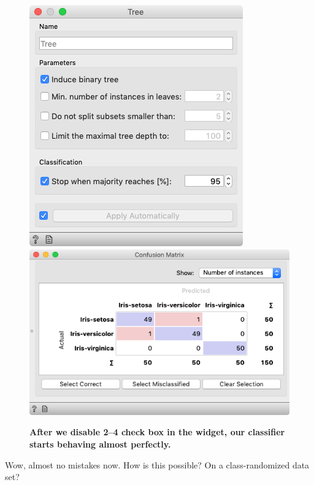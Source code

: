 \begin{figure}[h]
    \includegraphics[scale=0.35]{better_tree.png}
    \includegraphics[scale=0.35]{confusion_randomized_better.png}
    \caption{\textbf{\textsf{After we disable 2--4 check box in the  widget, our classifier starts behaving almost perfectly.}}}
\end{figure}


Wow, almost no mistakes now. How is this possible? On a class-randomized data set?

